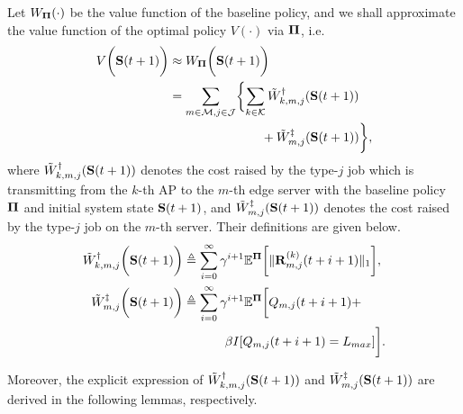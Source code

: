 Let $W_{\boldsymbol{\Pi}}(\cdot)$ be the value function of the baseline policy, and we shall approximate the value function of the optimal policy $V(\cdot)$ via $\boldsymbol{\Pi}$, i.e.
{\small
\begin{align}
    V\Paren{\Stat(t+1)} &\approx W_{\Baseline}\Paren{\Stat(t+1)}
    \nonumber\\
    &= \sum_{m\in\esSet,j\in\jSpace}\Brace{
        \sum_{k\in\apSet} \tilde{W}^{\AP}_{k,m,j}(\Stat(t+1))
        \nonumber\\
        &~~~~~~~~~~~~~~~~~~~~~~+\tilde{W}^{\ES}_{m,j}(\Stat(t+1))
    },
\end{align}
}
where $\tilde{W}^{\dagger}_{k,m,j}(\mathbf{S}(t+1))$ denotes the cost raised by the type-$j$ job which is transmitting from the $k$-th AP to the $m$-th edge server with the baseline policy $\boldsymbol{\Pi}$ and initial system state $\mathbf{S}(t+1)$, and $\tilde{W}^{\ddagger}_{m,j}(\mathbf{S}(t+1))$ denotes the cost raised by the type-$j$ job on the $m$-th server.
Their definitions are given below.
{\small
\begin{align}
    \tilde{W}^{\dagger}_{k,m,j} \bigg(\mathbf{S}(t+1)\bigg) &\triangleq
        \sum_{i=0}^{\infty} \gamma^{i+1} \mathbb{E}^{\boldsymbol{\Pi}}\bigg[
            \lVert\mathbf{R}^{(k)}_{m,j}(t+i+1)\|_1
        \bigg],
    \\    
    \tilde{W}^{\ddagger}_{m,j} \bigg(\mathbf{S}(t+1)\bigg) &\triangleq
        \sum_{i=0}^{\infty} \gamma^{i+1} \mathbb{E}^{\boldsymbol{\Pi}}\bigg[
            Q_{m,j}(t+i+1) +
            \nonumber\\
            &~~~~~~~~~~\beta I[Q_{m,j}(t+i+1) = L_{max}]
        \bigg].
\end{align}
}

Moreover, the explicit expression of $\tilde{W}^{\dagger}_{k,m,j}(\mathbf{S}(t+1))$ and $\tilde{W}^{\ddagger}_{m,j}(\mathbf{S}(t+1))$ are derived in the following lemmas, respectively.

